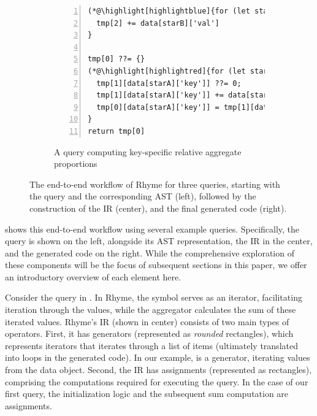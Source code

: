 \documentclass[runningheads]{llncs}
\newcommand{\lang}{Rhyme}
\begin{document}
\begin{figure}[t!]
\begin{subfigure}{\textwidth}
\begin{minipage}{0.4\textwidth}
\begin{lstlisting}[style=JavaScriptTiny, columns=flexible, numbers=left, xleftmargin=2pt]
(*@\highlight[highlightblue]{for (let starB in data)}@*) {  // loop hoisted!
  tmp[2] += data[starB]['val']
}

tmp[0] ??= {}
(*@\highlight[highlightred]{for (let starA in data)}@*) {
  tmp[1][data[starA]['key']] ??= 0;
  tmp[1][data[starA]['key']] += data[starA]['val']
  tmp[0][data[starA]['key']] = tmp[1][data[starA]['key']] / tmp[2] (*@\label{line:deps}@*)
}
return tmp[0]
\end{lstlisting}
\end{minipage}
\caption{A query computing key-specific 
relative aggregate proportions
}\label{fig:intro_q3}
\end{subfigure}
\caption{
The end-to-end workflow of \lang{} for three queries, starting with the query
and the corresponding AST (left),
followed by the construction of the IR (center), and the final generated code (right).
}\label{fig:intro}
\end{figure}

 shows this end-to-end workflow using several example queries.
Specifically, the query is shown on the left, alongside its AST representation,
the IR in the center, and the generated code on the right.
While the comprehensive exploration of these components will be the focus of
subsequent sections in this paper, we offer an introductory overview of each
element here.

Consider the query in .
In \lang{}, the \inline{*} symbol serves as an iterator, facilitating iteration through
the  values, while the aggregator  calculates the sum of
these iterated values.
\lang{}'s IR (shown in center) consists of two main types of operators.
First, it has generators (represented as \emph{rounded} rectangles), which represents iterators
that iterates through a list of items (ultimately translated into loops in
the generated code).
In our example,  is a generator, iterating values from the data object.
Second, the IR has assignments (represented as rectangles), comprising the
computations required for executing the query.
In the case of our first query, the initialization logic  and
the subsequent sum computation  are assignments.
\end{document}
